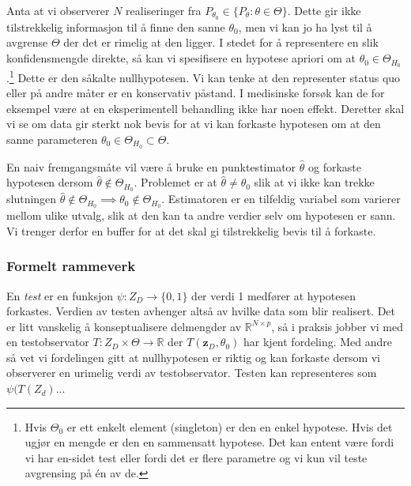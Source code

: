 Anta at vi observerer $N$ realiseringer fra $P_{\theta_0} \in \{P_{\theta}:\theta \in \Theta\}$. Dette gir ikke tilstrekkelig informasjon til å finne den sanne $\theta_0$, men vi kan jo ha lyst til å avgrense $\Theta$ der det er rimelig at den ligger. I stedet for å representere en slik konfidensmengde direkte, så kan vi spesifisere en hypotese apriori om at $\theta_0 \in \Theta_{H_0}$.\footnote{Hvis $\Theta_0$ er ett enkelt element (singleton) er den en enkel hypotese. Hvis det ugjør en mengde er den en sammensatt hypotese. Det kan entent være fordi vi har en-sidet test eller fordi det er flere parametre og vi kun vil teste avgrensing på én av de.} Dette er den såkalte nullhypotesen. Vi kan tenke at den representer status quo eller på andre måter er en konservativ påstand. I medisinske forsøk kan de for eksempel være at en eksperimentell behandling ikke har noen effekt. Deretter skal vi se om data gir sterkt nok bevis for at vi kan forkaste hypotesen om at den sanne parameteren $\theta_0 \in \Theta_{H_0} \subset \Theta$.

En naiv fremgangsmåte vil være å bruke en punktestimator $\hat{\theta}$ og forkaste hypotesen dersom $\hat{\theta} \notin \Theta_{H_0}$. Problemet er at $\hat{\theta} \neq \theta_0$ slik at vi ikke kan trekke slutningen $\hat{\theta} \notin \Theta_{H_0} \implies \theta_0 \notin \Theta_{H_0}$.   Estimatoren er en tilfeldig variabel som varierer mellom ulike utvalg, slik at den kan ta andre verdier selv om hypotesen er sann. Vi trenger derfor en buffer for at det skal gi tilstrekkelig bevis til å forkaste. 
\subsubsection{Formelt rammeverk}
En \textit{test} er en funksjon $\psi: Z_D \to \{0,1\}$ der verdi 1 medfører at hypotesen forkastes. Verdien av testen avhenger altså av hvilke data som blir realisert. Det er litt vanskelig å konseptualisere delmengder av $\mathbb{R}^{N\times p}$, så i praksis jobber vi med en testobservator $T:Z_D\times \Theta \to \mathbb{R}$ der $T(\mathbf{z}_D, \theta_0)$ har kjent fordeling. Med andre så vet vi fordelingen gitt at nullhypotesen er riktig og kan forkaste dersom vi observerer en urimelig verdi av testobservator. Testen kan representeres som $\psi(T(Z_d)$...

